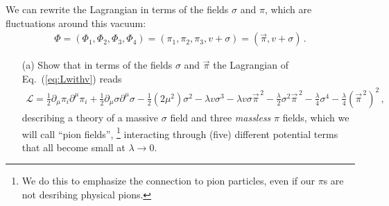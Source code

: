 \documentclass[prd,%
,superscriptaddress,%
nofootinbib,%
tightenlines ]{revtex4}
\begin{document}
We can rewrite the Lagrangian in terms of the fields $\sigma$ and $\pi$, which are fluctuations around this vacuum:
\begin{eqnarray}
	\Phi = (\Phi_1, \Phi_2, \Phi_3, \Phi_4) 
	= (\pi_1, \pi_2, \pi_3,v + \sigma) = (\vec{\pi}, v+\sigma)\,.
\end{eqnarray}

\begin{itemize}
	\item[(a)] Show that in terms of the fields $\sigma$ and $\vec \pi$ the Lagrangian of Eq.~(\ref{eq:Lwithv}) reads
	\begin{eqnarray}
	\mathcal{L} = 
	\frac12 \partial_{\mu} \pi_i \partial^{\mu} \pi_i
	+\frac12 \partial_{\mu} \sigma \partial^{\mu} \sigma
	-\frac12 (2\mu^2)\sigma^2
	-\lambda v\sigma^3 -\lambda v\sigma \vec{\pi}^{\,2} 
	-\frac{\lambda}{2} \sigma^2 \vec{\pi}^{\,2} 
	-\frac{\lambda}{4} \sigma^4 
	-\frac{\lambda}{4} (\vec{\pi}^{\,2})^2
	\,,
	\end{eqnarray}
	describing a theory of a massive $\sigma$ field and three \emph{massless} $\pi$ fields, which we will call ``pion fields'',%
	\footnote{We do this to emphasize the connection to pion particles, even if our $\pi$s are not desribing physical pions.}
	interacting through (five) different potential terms that all become small at $\lambda\rightarrow 0$.
	

\end{itemize}
\end{document}
